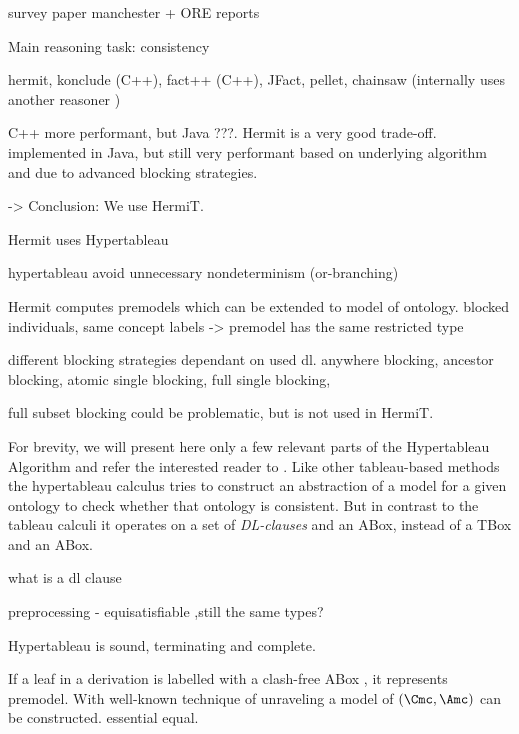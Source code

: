 survey paper manchester + ORE reports

Main reasoning task: consistency

hermit, konclude (C++), fact++ (C++), JFact, pellet, chainsaw (internally uses another reasoner )

C++ more performant, but Java ???. Hermit is a very good trade-off. implemented in Java, but still
very performant based on underlying algorithm and due to advanced blocking strategies.

-> Conclusion: We use HermiT.

Hermit uses Hypertableau


hypertableau avoid unnecessary nondeterminism (or-branching)

Hermit computes premodels which can be extended to model of ontology. blocked individuals, same
concept labels -> premodel has the same restricted type

different blocking strategies dependant on used dl. anywhere blocking, ancestor blocking, atomic
single blocking, full single blocking, 

full subset blocking could be problematic, but is not used in HermiT.


For brevity, we will present here only a few relevant parts of the Hypertableau Algorithm and refer
the interested reader to . Like other tableau-based
methods the hypertableau calculus tries to construct an abstraction of a model for a given ontology
to check whether that ontology is consistent. But in contrast to the tableau calculi it operates
on a set of \emph{DL-clauses} and an ABox, instead of a TBox and an ABox.

what is a dl clause

preprocessing - equisatisfiable ,still the same types?


\begin{lemma}[citation]
  Hypertableau is sound, terminating and complete.
\end{lemma}

If a leaf in a derivation is labelled with a clash-free ABox \A, it represents premodel. With
well-known technique of unraveling  a model of $(\Cmc, \A)$ can be
constructed. essential equal. 

 



\vspace{1cm}


